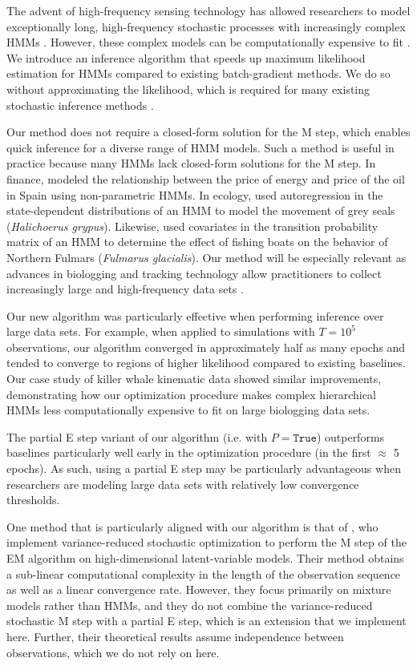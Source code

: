 The advent of high-frequency sensing technology has allowed researchers to model exceptionally long, high-frequency stochastic processes with increasingly complex HMMs \citep{Patterson:2017}. However, these complex models can be computationally expensive to fit \citep{Glennie:2023}. We introduce an inference algorithm that speeds up maximum likelihood estimation for HMMs compared to existing batch-gradient methods. We do so without approximating the likelihood, which is required for many existing stochastic inference methods \citep{Gotoh:1998,Ye:2017}.

Our method does not require a closed-form solution for the M step, which enables quick inference for a diverse range of HMM models. Such a method is useful in practice because many HMMs lack closed-form solutions for the M step. In finance, \citet{Langrock:2018} modeled the relationship between the price of energy and price of the oil in Spain using non-parametric HMMs. In ecology, \citet{Lawler:2019} used autoregression in the state-dependent distributions of an HMM to model the movement of grey seals (\textit{Halichoerus grypus}). Likewise, \citet{Pirotta:2018} used covariates in the transition probability matrix of an HMM to determine the effect of fishing boats on the behavior of Northern Fulmars (\textit{Fulmarus glacialis}). Our method will be especially relevant as advances in biologging and tracking technology allow practitioners to collect increasingly large and high-frequency data sets \citep{Patterson:2017}. 

Our new algorithm was particularly effective when performing inference over large data sets. For example, when applied to simulations with $T=10^{5}$ observations, our algorithm converged in approximately half as many epochs and tended to converge to regions of higher likelihood compared to existing baselines. Our case study of killer whale kinematic data showed similar improvements, demonstrating how our optimization procedure makes complex hierarchical HMMs less computationally expensive to fit on large biologging data sets.

The partial E step variant of our algorithm (i.e. with $P = \texttt{True}$) outperforms baselines particularly well early in the optimization procedure (in the first $\approx$ 5 epochs). As such, using a partial E step may be particularly advantageous when researchers are modeling large data sets with relatively low convergence thresholds.

One method that is particularly aligned with our algorithm is that of \citet{Zhu:2017}, who implement variance-reduced stochastic optimization to perform the M step of the EM algorithm on high-dimensional latent-variable models. Their method obtains a sub-linear computational complexity in the length of the observation sequence as well as a linear convergence rate. However, they focus primarily on mixture models rather than HMMs, and they do not combine the variance-reduced stochastic M step with a partial E step, which is an extension that we implement here. Further, their theoretical results assume independence between observations, which we do not rely on here.

